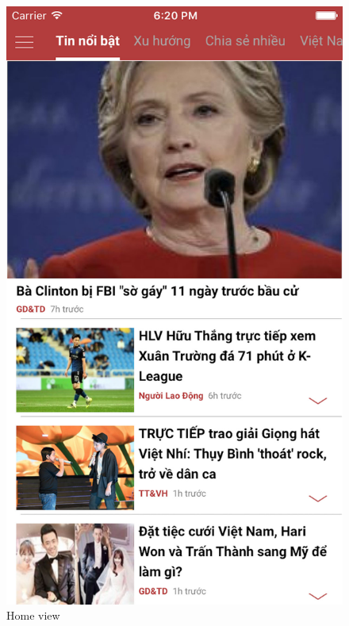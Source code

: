 \documentclass[11pt,a4paper,oneside,article]{memoir}
\begin{document}
\begin{figure}[!htb]
   \begin{minipage}{0.48\textwidth}
     \centering
     \includegraphics[width=.8\linewidth]{home-scene}
     \caption{Home view}\label{scene:home}
   \end{minipage}\hfill
   \begin {minipage}{0.48\textwidth}
     \centering

\end{minipage}
\end{figure}
\end{document}
